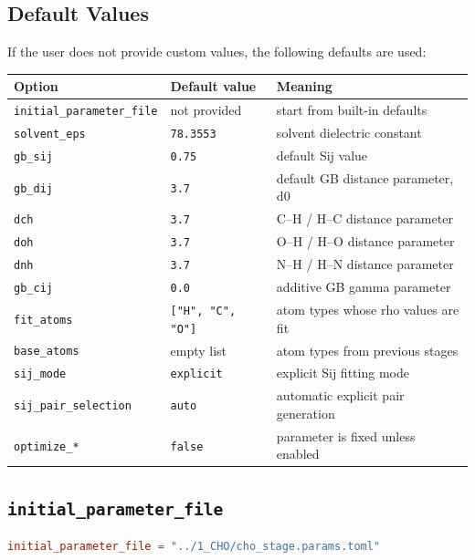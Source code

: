 \documentclass[11pt]{article}
\begin{document}
\subsection{Default Values}

If the user does not provide custom values, the following defaults are used:

\begin{center}
\begin{tabular}{lll}
\toprule
Option & Default value & Meaning \\
\midrule
\texttt{initial\_parameter\_file} & not provided & start from built-in defaults \\
\texttt{solvent\_eps} & \texttt{78.3553} & solvent dielectric constant \\
\texttt{gb\_sij} & \texttt{0.75} & default Sij value \\
\texttt{gb\_dij} & \texttt{3.7} & default GB distance parameter, d0 \\
\texttt{dch} & \texttt{3.7} & C--H / H--C distance parameter \\
\texttt{doh} & \texttt{3.7} & O--H / H--O distance parameter \\
\texttt{dnh} & \texttt{3.7} & N--H / H--N distance parameter \\
\texttt{gb\_cij} & \texttt{0.0} & additive GB gamma parameter \\
\texttt{fit\_atoms} & \texttt{["H", "C", "O"]} & atom types whose rho values are fit \\
\texttt{base\_atoms} & empty list & atom types from previous stages \\
\texttt{sij\_mode} & \texttt{explicit} & explicit Sij fitting mode \\
\texttt{sij\_pair\_selection} & \texttt{auto} & automatic explicit pair generation \\
\texttt{optimize\_*} & \texttt{false} & parameter is fixed unless enabled \\
\bottomrule
\end{tabular}
\end{center}

\subsection{\texttt{initial\_parameter\_file}}

\begin{lstlisting}[language=toml]
initial_parameter_file = "../1_CHO/cho_stage.params.toml"
\end{lstlisting}
\end{document}
